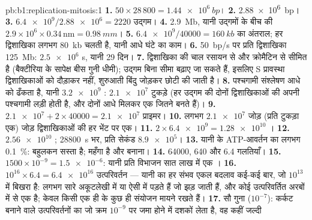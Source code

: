 \begin{solution}{pb:b1:replication-mitosis:1}
\textbf{1.} $50\times 28\,800 = \qty{1.44e6}{bp}$।
\textbf{2.} \qty{2.88e6}{bp}।
\textbf{3.} $\num{6.4e9}/\num{2.88e6} = 2220$ उद्गम।
\textbf{4.} \qty{2.9}{Mb}, यानी उद्गमों के बीच  की $2.9\times 10^6\times 0.34\,\mathrm{nm} =
\qty{0.98}{mm}$।
\textbf{5.} $\num{6.4e9}/\num{40000} = \qty{160}{kb}$ का अंतराल; हर
द्विशाखिका लगभग \qty{80}{kb} चलती है, यानी आधे घंटे का काम।
\textbf{6.} \qty{50}{bp/s} पर प्रति द्विशाखिका \qty{125}{Mb}: $\num{2.5e6}$ s,
यानी 29 दिन।
\textbf{7.} द्विशाखिका की चाल रसायन से और क्रोमैटिन से सीमित है
(बैक्टीरिया के सापेक्ष बीस गुनी धीमी); उद्गम बिना सीमा बढ़ाए जा सकते हैं,
इसलिए S प्रावस्था द्विशाखिकाओं को दौड़ाकर नहीं, शुरुआती बिंदु जोड़कर
छोटी की जाती है।
\textbf{8.} पश्चगामी संश्लेषण आधे  को ढँकता है, यानी $\num{3.2e9}$
: $\num{2.1e7}$ टुकड़े (हर उद्गम की दोनों द्विशाखिकाओं की
अपनी पश्चगामी लड़ी होती है, और दोनों आधे मिलकर एक  जितने बनते हैं)।
\textbf{9.} $\num{2.1e7} + 2\times\num{40000} = \num{2.1e7}$ प्राइमर।
\textbf{10.} लगभग $\num{2.1e7}$ जोड़ (प्रति टुकड़ा एक) जोड़
द्विशाखिकाओं की हर भेंट पर एक।
\textbf{11.} $2\times\num{6.4e9} = \num{1.28e10}$ ।
\textbf{12.} $\num{2.56e10}$ ; \qty{28800}{s} भर, प्रति सेकंड
$\num{8.9e5}$।
\textbf{13.} यानी  के ATP-आवर्तन का लगभग \qty{0.1}{\%}:
बहुलकन सस्ता है; महँगा है  और  बनाना।
\textbf{14.} \num{64000}, 640 और 6.4 गलतियाँ।
\textbf{15.} $1500\times 10^{-9} = \num{1.5e-6}$: यानी प्रति विभाजन सात
लाख में एक ।
\textbf{16.} $10^{16}\times 6.4 = \num{6.4e16}$ उत्परिवर्तन --- यानी
 का हर संभव एकल बदलाव कई-कई बार, जो $10^{13}$  में बिखरा
है: लगभग सारे अकूटलेखी  में या ऐसी  में पड़ते हैं जो झड़
जाती हैं, और कोई उत्परिवर्तित  अरबों में से एक है; केवल किसी एक ही
 के कुछ ही संयोजन मायने रखते हैं।
\textbf{17.} सौ गुना ($10^{-7}$): कर्कट बनाने वाले उत्परिवर्तनों का जो
क्रम $10^{-9}$ पर जमा होने में दशकों लेता है, वह कहीं जल्दी

\end{solution}

